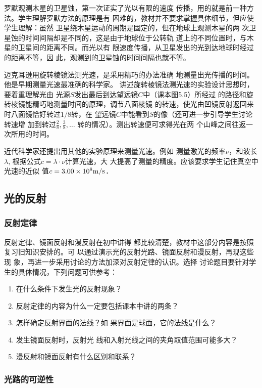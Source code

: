 罗默观测木星的卫星蚀，第一次证实了光以有限的速度
传播，用的就是前一种方法。学生理解罗默方法的原理是有
困难的，教材并不要求掌握具体细节，但应使学生理解：虽然
卫星绕木星运动的周期是固定的，但在地球上观测木星的两
次卫星蚀的时间间隔却是不同的，这是由于地球位于公转轨
道上的不同位置时，与木星的卫星间的距离不同。而光以有
限速度传播，从卫星发出的光到达地球时经过的距离不等，因
此，观测到的卫星蚀的时间间隔也就不等。

迈克耳逊用旋转棱镜法测光速，是采用精巧的办法准确
地测量出光传播的时间。他是早期测量光速最准确的科学家。
讲述旋转棱镜法测光速的实验设计思想时，要着重理解光由
光源$S$发出最后到达望远镜$C$中（课本图5.5）所经过
的路径和旋转棱镜能精巧地测量时间的原理，调节八面棱镜
的转速，使光由凹镜反射返回来时八面镜恰好转过$1/8$转，在
望远镜$C$中能看到$S$的像（还可进一步引导学生讨论转速增
加到转过$\frac{2}{8},\frac{3}{8},\ldots$
转的情况）。测出转速便可求得光在两
个山峰之间往返一次所用的时间。

近代科学家还提出用其他的实验原理来测量光速。例如
测量激光的频率$\nu$，和波长$\lambda$, 根据公式$c=\lambda\cdot \nu$计算光速，大
大提高了测量的精度。应该要求学生记住真空中光速的近似
值$c=3.00\times10^8\text{m}/\text{s}$．

\subsection{光的反射}
\subsubsection{反射定律}

反射定律、镜面反射和漫反射在初中讲得
都比较清楚，教材中这部分内容是按照复习旧知识安排的。可
以通过演示光的反射光路、镜面反射和漫反射，再现这些现
象，再进一步采用讨论的方法加深对反射定律的认识。选择
讨论题目要针对学生的具体情况，下列问题可供参考：
\begin{enumerate}
\item 在什么条件下发生光的反射现象？
\item 反射定律的内容为什么一定要包括课本中讲的两条？
    \item 怎样确定反射界面的法线？如
果界面是球面，它的法线是什么？
    \item 发生镜面反射时，反射光
线和入射光线之间的夹角取值范围可能多大？
    \item 漫反射和镜面反射有什么区别和联系？
\end{enumerate}



\subsubsection{光路的可逆性}

